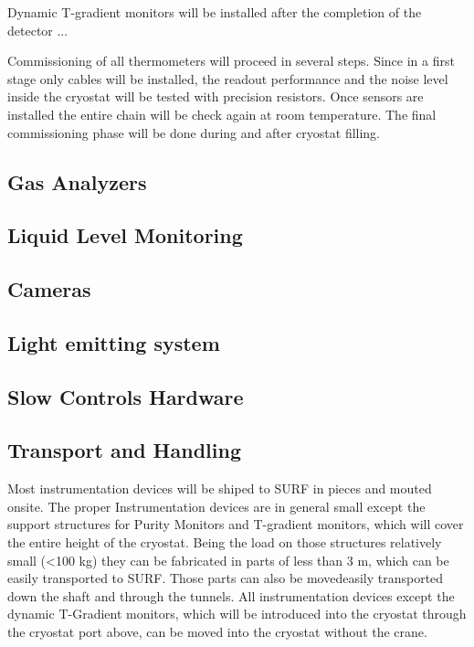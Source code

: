Dynamic T-gradient monitors will be installed after the completion of the detector ...



Commissioning of all thermometers will proceed in several steps. Since in a first stage only cables will be installed,
the readout performance and the noise level inside the cryostat will be
tested with precision resistors. Once sensors are installed the entire chain will be check again at room temperature.
The final commissioning phase will be done during and after cryostat filling.  


\subsection{Gas Analyzers}
\label{sec:fdsp-slow-cryo-install-ga}
 

\subsection{Liquid Level Monitoring}
\label{sec:fdsp-slow-cryo-install-llm}


\subsection{Cameras}
\label{sec:fdsp-slow-cryo-install-c}


\subsection{Light emitting system}
\label{sec:fdsp-slow-cryo-install-les}


\subsection{Slow Controls Hardware}
\label{sec:fdsp-slow-cryo-install-sc-hard}



\subsection{Transport and Handling}
\label{sec:fdsp-slow-cryo-install-transport}

Most instrumentation devices will be shiped to SURF in pieces and mouted onsite. The proper 
Instrumentation devices are in general small except the support structures for Purity Monitors and T-gradient monitors,
which will cover the entire height of the cryostat. Being the load on those structures relatively small (<100 kg) they can be fabricated in parts of less than 3 m,
which can be easily transported to SURF. Those parts can also be movedeasily transported down the shaft and through the tunnels.
All instrumentation devices except the dynamic T-Gradient monitors, which will be introduced into the cryostat through the cryostat port above, can be
moved into the cryostat without the crane.

